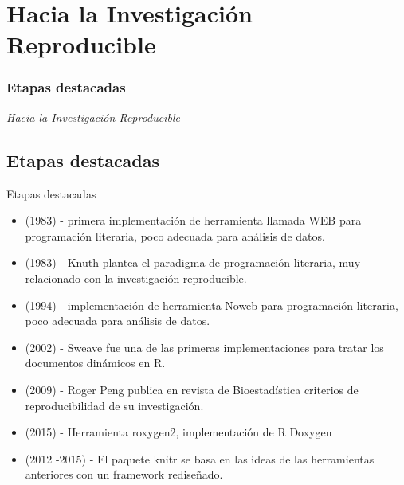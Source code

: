 \documentclass[11pt]{beamer}					%
\begin{document}
\section{Hacia la Investigación Reproducible}	
		 \begin{frame}[fragile]
			\frametitle{Etapas destacadas}
			\begin{huge}
			\begin{center}
				\emph{\textit{Hacia la Investigación Reproducible}}
			\end{center}
			\end{huge}
		\end{frame}		
		   		
    		\subsection{Etapas destacadas}			
			\begin{frame}[fragile]
		
			
			\begin{block}{Etapas destacadas}
			
			\begin{itemize}
			    \item (1983) - primera implementación de herramienta llamada WEB para programación literaria, poco adecuada para análisis de datos.
				\item (1983) - Knuth plantea el paradigma de programación literaria, muy relacionado con la investigación reproducible.
				\item (1994) -  implementación de herramienta Noweb para programación literaria, poco adecuada para análisis de datos.
				\item (2002) - Sweave fue una de las primeras implementaciones para tratar los documentos dinámicos en R.
				\item (2009) - Roger Peng publica en revista de Bioestadística criterios de reproducibilidad de su investigación.
				\item (2015) - Herramienta roxygen2, implementación de R Doxygen
				\item (2012 -2015) - El paquete knitr se basa en las ideas de las herramientas anteriores con un framework rediseñado.

				\end{itemize}

				\end{block}

			\end{frame}
			
\end{document}
